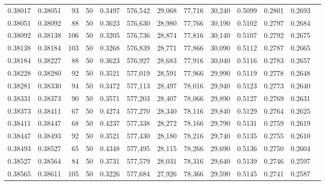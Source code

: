 \begin{tabular}{rrrrrrrrrrrrr}
0.38017 & 0.38051 &    93 &  50 &                                     0.3497 & 576,542 &  29,068 &  77,716 &  30,240 & 0.5099 & 0.2801 & 0.2693 \\
0.38051 & 0.38092 &    88 &  50 &                                     0.3623 & 576,630 &  28,980 &  77,766 &  30,190 & 0.5102 & 0.2797 & 0.2684 \\
0.38092 & 0.38138 &   106 &  50 &                                     0.3205 & 576,736 &  28,874 &  77,816 &  30,140 & 0.5107 & 0.2792 & 0.2675 \\
0.38138 & 0.38184 &   103 &  50 &                                     0.3268 & 576,839 &  28,771 &  77,866 &  30,090 & 0.5112 & 0.2787 & 0.2665 \\
0.38184 & 0.38227 &    88 &  50 &                                     0.3623 & 576,927 &  28,683 &  77,916 &  30,040 & 0.5116 & 0.2783 & 0.2657 \\
0.38228 & 0.38280 &    92 &  50 &                                     0.3521 & 577,019 &  28,591 &  77,966 &  29,990 & 0.5119 & 0.2778 & 0.2648 \\
0.38281 & 0.38330 &    94 &  50 &                                     0.3472 & 577,113 &  28,497 &  78,016 &  29,940 & 0.5123 & 0.2773 & 0.2640 \\
0.38331 & 0.38373 &    90 &  50 &                                     0.3571 & 577,203 &  28,407 &  78,066 &  29,890 & 0.5127 & 0.2769 & 0.2631 \\
0.38373 & 0.38411 &    67 &  50 &                                     0.4274 & 577,270 &  28,340 &  78,116 &  29,840 & 0.5129 & 0.2764 & 0.2625 \\
0.38411 & 0.38447 &    68 &  50 &                                     0.4237 & 577,338 &  28,272 &  78,166 &  29,790 & 0.5131 & 0.2759 & 0.2619 \\
0.38447 & 0.38493 &    92 &  50 &                                     0.3521 & 577,430 &  28,180 &  78,216 &  29,740 & 0.5135 & 0.2755 & 0.2610 \\
0.38493 & 0.38527 &    65 &  50 &                                     0.4348 & 577,495 &  28,115 &  78,266 &  29,690 & 0.5136 & 0.2750 & 0.2604 \\
0.38527 & 0.38564 &    84 &  50 &                                     0.3731 & 577,579 &  28,031 &  78,316 &  29,640 & 0.5139 & 0.2746 & 0.2597 \\
0.38565 & 0.38611 &   105 &  50 &                                     0.3226 & 577,684 &  27,926 &  78,366 &  29,590 & 0.5145 & 0.2741 & 0.2587 \\

\end{tabular}

